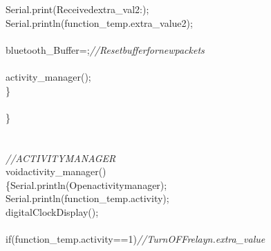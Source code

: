 \documentclass[a4paper, 12pt]{article}
\newcommand\SPC{\hspace*{0.6em}}
\newcommand\QOT{\mbox{\char 34}}
\newcommand{\CppAComment}[1]{\textit{\textcolor[rgb]{0.2,0.4,1}{#1}}}
\newcommand{\CppAIdentifier}[1]{\textcolor[rgb]{0,1,0}{#1}}
\newcommand{\CppANumber}[1]{\textcolor[rgb]{0,0,1}{#1}}
\newcommand{\CppAReservedWord}[1]{\textcolor[rgb]{0,0.5,0}{#1}}
\newcommand{\CppASpace}[1]{\textcolor[rgb]{1,1,1}{\colorbox[rgb]{0,0,0}{#1}}}
\newcommand{\CppAString}[1]{\textcolor[rgb]{0.76,0.76,0.76}{#1}}
\newcommand{\CppASymbol}[1]{\textcolor[rgb]{1,0,0}{#1}}
\begin{document}
\begin{ttfamily}
\CppASpace{\SPC \SPC \SPC \SPC \SPC \SPC \SPC \SPC \SPC \SPC \SPC \SPC \SPC \SPC }\CppAIdentifier{Serial}\CppASymbol{.}\CppAIdentifier{print}\CppASymbol{(}\CppAString{\QOT Received\SPC extra\_val2\SPC :\SPC \QOT }\CppASymbol{)}\CppASymbol{;}\\
\CppASpace{\SPC \SPC \SPC \SPC \SPC \SPC \SPC \SPC \SPC \SPC \SPC \SPC \SPC \SPC }\CppAIdentifier{Serial}\CppASymbol{.}\CppAIdentifier{println}\CppASymbol{(}\CppAIdentifier{function\_temp}\CppASymbol{.}\CppAIdentifier{extra\_value2}\CppASymbol{)}\CppASymbol{;}\\
\\
\CppASpace{\SPC \SPC \SPC \SPC \SPC \SPC \SPC \SPC \SPC \SPC \SPC \SPC }\CppAIdentifier{bluetooth\_Buffer}\CppASymbol{=}\CppAString{\QOT \QOT }\CppASymbol{;}\CppASpace{\SPC }\CppAComment{//Reset\SPC buffer\SPC for\SPC new\SPC packets}\\
\\
\CppASpace{\SPC \SPC \SPC \SPC \SPC \SPC \SPC \SPC \SPC \SPC \SPC \SPC }\CppAIdentifier{activity\_manager}\CppASymbol{(}\CppASymbol{)}\CppASymbol{;}\\
\CppASpace{\SPC \SPC \SPC \SPC \SPC \SPC \SPC \SPC }\CppASymbol{\}}\\
\CppASpace{\SPC \SPC }\\
\CppASymbol{\}}\\
\\
\\
\CppAComment{//\SPC ACTIVITY\SPC MANAGER}\\
\CppAReservedWord{void}\CppASpace{\SPC }\CppAIdentifier{activity\_manager}\CppASpace{\SPC }\CppASymbol{(}\CppASymbol{)}\\
\CppASymbol{\{}\CppASpace{\SPC }\CppAIdentifier{Serial}\CppASymbol{.}\CppAIdentifier{println}\CppASymbol{(}\CppAString{\QOT Open\SPC activity\SPC manager\QOT }\CppASymbol{)}\CppASymbol{;}\\
\CppASpace{\SPC \SPC }\CppAIdentifier{Serial}\CppASymbol{.}\CppAIdentifier{println}\CppASymbol{(}\CppAIdentifier{function\_temp}\CppASymbol{.}\CppAIdentifier{activity}\CppASymbol{)}\CppASymbol{;}\\
\CppASpace{\SPC \SPC }\CppAIdentifier{digitalClockDisplay}\CppASymbol{(}\CppASymbol{)}\CppASymbol{;}\\
\CppASpace{\SPC \SPC }\\
\CppASpace{\SPC \SPC }\CppAReservedWord{if}\CppASpace{\SPC }\CppASymbol{(}\CppAIdentifier{function\_temp}\CppASymbol{.}\CppAIdentifier{activity}\CppASpace{\SPC }\CppASymbol{==}\CppASpace{\SPC }\CppANumber{1}\CppASymbol{)}\CppASpace{\SPC }\CppAComment{//\SPC Turn\SPC OFF\SPC relay\SPC n.\SPC extra\_value}\\

\end{ttfamily}
\end{document}
